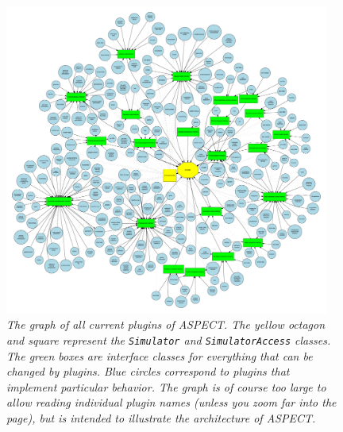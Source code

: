 \documentclass{article}
\newcommand{\aspect}{\textsc{ASPECT}}
\begin{document}
\begin{figure}[tbp]
  \centering
  \includegraphics[width=0.95\textwidth]{plugin_graph.pdf}
  \caption{\it The graph of all current plugins of \aspect{}. The yellow
  octagon and square represent the \texttt{Simulator} and
  \texttt{SimulatorAccess} classes. The green boxes are interface classes for
  everything that can be changed by plugins. Blue circles correspond to plugins
  that implement particular behavior. The graph is of course too large to allow
  reading individual plugin names (unless you zoom far into the page), but is
  intended to illustrate the architecture of \aspect{}.}
  \label{fig:plugins}
\end{figure}
\end{document}
